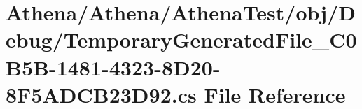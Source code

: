 \hypertarget{_athena_test_2obj_2_debug_2_temporary_generated_file__036_c0_b5_b-1481-4323-8_d20-8_f5_a_d_c_b23_d92_8cs}{\section{Athena/\-Athena/\-Athena\-Test/obj/\-Debug/\-Temporary\-Generated\-File\-\_\-C0\-B5\-B-\/1481-\/4323-\/8\-D20-\/8\-F5\-A\-D\-C\-B23\-D92.cs File Reference}
\label{_athena_test_2obj_2_debug_2_temporary_generated_file__036_c0_b5_b-1481-4323-8_d20-8_f5_a_d_c_b23_d92_8cs}
}
